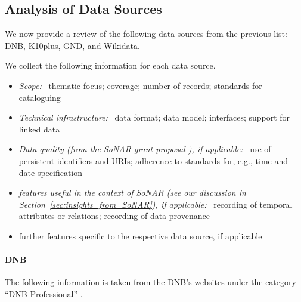 \subsection{Analysis of Data Sources}
\label{subsec:analysis_data_sources}

We now provide a review of the following data sources from the previous list:
\gls{DNB}, \gls{K10plus}, \gls{GND}, and Wikidata.



We collect the following information for each data source.
%
\begin{itemize}
  \item
    \emph{Scope:}~
    thematic focus; coverage; number of records; standards for cataloguing
  \item
    \emph{Technical infrastructure:}~
    data format; data model; interfaces; support for linked data
  \item
    \emph{Data quality (from the \gls{SoNAR} grant proposal \autocite[p.\,19ff.]{SchneiderKempf2018}),
    if applicable:}~
    use of persistent identifiers and \glspl{URI}; adherence to standards for, e.g., time and date specification
  \item
    \emph{features useful in the context of \gls{SoNAR} (see our discussion in Section~\ref{sec:insights_from_SoNAR}), if applicable:}~
    recording of temporal attributes or relations; recording of data provenance
  \item
    further features specific to the respective data source, if applicable
\end{itemize}

\paragraph{DNB}

The following information is taken from the \gls{DNB}'s websites under the category \enquote{DNB Professional} \autocite{DNB_coll_mand,DNB_cataloguing,DNB_metadata}.

